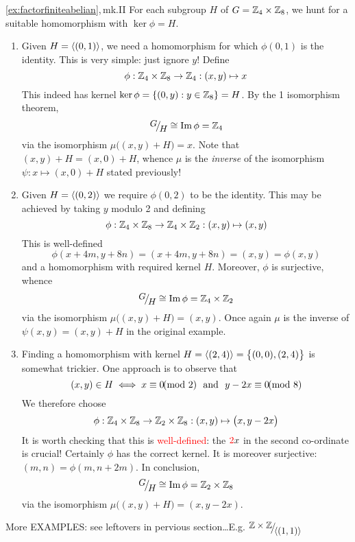 \begin{examples*}{\ref{ex:factorfiniteabelian},\,mk.II}{}
	For each subgroup $H$ of $G=\mathbb{Z}_4\times\mathbb{Z}_8$, we hunt for a suitable homomorphism with $\ker\phi =H$.
	\begin{enumerate}
	  \item Given $H=\left\langle (0,1)\right\rangle$, we need a homomorphism for which $\phi(0,1)$ is the identity. This is very simple: just ignore $y$! Define
	  \[
	  	\phi:\mathbb{Z}_4\times\mathbb{Z}_8\to\mathbb{Z}_4:(x,y)\mapsto x
	  \]
	  This indeed has kernel $\ker\phi=\{(0,y):y\in\mathbb{Z}_8\} =H$. By the 1\st{} isomorphism theorem,
	  \[
	  	\quotient GH\cong\image\phi=\Z_4
	  \]
	  via the isomorphism $\mu\bigl((x,y)+H\bigr)=x$. Note that $(x,y)+H=(x,0)+H$, whence $\mu$ is the \emph{inverse} of the isomorphism $\psi:x\mapsto (x,0)+H$ stated previously!
	
	  \item Given $H=\left\langle (0,2)\right\rangle$ we require $\phi(0,2)$ to be the identity. This may be achieved by taking $y$ modulo 2 and defining
	  \[
	  	\phi:\mathbb{Z}_4\times\mathbb{Z}_8\to\mathbb{Z}_4\times\mathbb{Z}_2:(x,y)\mapsto (x,y)
	  \]
	  This is well-defined
	  \[
	   	\phi(x+4m,y+8n)=(x+4m,y+8n)=(x,y)=\phi(x,y)\tag{since $2\mid 8$}
	  \]
	  and a homomorphism with required kernel $H$. Moreover, $\phi$ is surjective, whence
	  \[
	  	\quotient GH\cong \image\phi= \Z_4\times\Z_2
	  \]
	  via the isomorphism $\mu\bigl((x,y)+H\bigr) =(x,y)$. Once again $\mu$ is the inverse of $\psi(x,y)=(x,y)+H$ in the original example.
	  
	  \item Finding a homomorphism with kernel $H=\left\langle (2,4)\right\rangle=\bigl\{(0,0),(2,4)\bigr\}$ is somewhat trickier. One approach is to observe that
	  \[
	  	(x,y)\in H\iff x\equiv 0\negthickspace\negthickspace\pmod 2
	  	\ \text{ and }\ 
	  	y-2x\equiv 0\negthickspace\negthickspace\pmod 8
	  \]
	  We therefore choose
	  \[
	 		\phi:\mathbb{Z}_4\times\mathbb{Z}_8\to\mathbb{Z}_2\times\mathbb{Z}_8:(x,y)\mapsto\bigl(x,y-2x\bigr)
	 	\]
	  It is worth checking that this is \textcolor{red}{well-defined}: the $\textcolor{red}{2}x$ in the second co-ordinate is crucial! Certainly $\phi$ has the correct kernel. It is moreover surjective: $(m,n)=\phi(m,n+2m)$. In conclusion,
	  \[
	  	\quotient GH\cong\image\phi=\Z_2\times\Z_8
	  \]
	  via the isomorphism $\mu\bigl((x,y)+H\bigr)=(x,y-2x)$.
	\end{enumerate}
\end{examples*}


More EXAMPLES: see leftovers in pervious section\ldots E.g. $\quotient{\Z\times\Z}{\ip{(1,1)}}$

